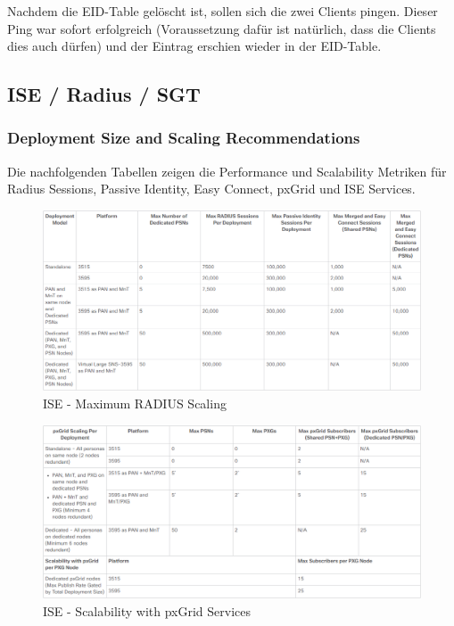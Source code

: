 Nachdem die EID-Table gelöscht ist, sollen sich die zwei Clients pingen. Dieser Ping war sofort erfolgreich (Voraussetzung dafür ist natürlich, dass die Clients dies auch dürfen) und der Eintrag erschien wieder in der EID-Table.

\subsection{ISE / Radius / SGT}

\subsubsection{Deployment Size and Scaling Recommendations}

Die nachfolgenden Tabellen zeigen die Performance und Scalability Metriken für Radius Sessions, Passive Identity, Easy Connect, pxGrid und ISE Services.

\begin{figure}[H]
	\centering
	\includegraphics[width=1\linewidth]{img/Absicherung/ISE-MaxRadiusScaling}
	\caption{ISE - Maximum RADIUS Scaling \cite{ise-scale}}
	\label{fig:ISE - Maximum RADIUS Scaling}
\end{figure}

\begin{figure}[H]
	\centering
	\includegraphics[width=1\linewidth]{img/Absicherung/ISE-pxGridServicesScalability}
	\caption{ISE - Scalability with pxGrid Services \cite{ise-scale}}
	\label{fig:ISE - Scalability with pxGrid Service}
\end{figure}

